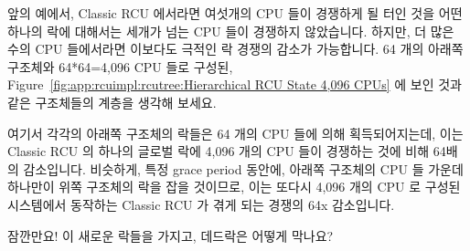 앞의 예에서, Classic RCU 에서라면 여섯개의 CPU 들이 경쟁하게 될 터인 것을 어떤
하나의 락에 대해서는 세개가 넘는 CPU 들이 경쟁하지 않았습니다.
하지만, 더 많은 수의 CPU 들에서라면 이보다도 극적인 락 경쟁의 감소가
가능합니다.
64 개의 아래쪽 구조체와 64*64=4,096 CPU 들로 구성된,
Figure~\ref{fig:app:rcuimpl:rcutree:Hierarchical RCU State 4,096 CPUs} 에 보인
것과 같은  구조체들의 계층을 생각해 보세요.

여기서 각각의 아래쪽  구조체의 락들은 64 개의 CPU 들에 의해
획득되어지는데, 이는 Classic RCU 의 하나의 글로벌 락에 4,096 개의 CPU 들이
경쟁하는 것에 비해 64배의 감소입니다.
비슷하게, 특정 grace period 동안에, 아래쪽  구조체의 CPU 들 가운데
하나만이 위쪽  구조체의 락을 잡을 것이므로, 이는 또다시 4,096 개의
CPU 로 구성된 시스템에서 동작하는 Classic RCU 가 겪게 되는 경쟁의 64x
감소입니다.
\iffalse

In the above sequence, there were never more than three CPUs
contending for any one lock, in happy contrast to Classic RCU,
where all six CPUs might contend.
However, even more dramatic reductions in lock contention are
possible with larger numbers of CPUs.
Consider a hierarchy of \co{rcu_node} structures, with
64 lower structures and 64*64=4,096 CPUs, as shown in
Figure~\ref{fig:app:rcuimpl:rcutree:Hierarchical RCU State 4,096 CPUs}.

Here each of the lower \co{rcu_node} structures' locks
are acquired by 64 CPUs, a 64-times reduction from the 4,096 CPUs
that would acquire Classic RCU's single global lock.
Similarly, during a given grace period, only one CPU from each of
the lower \co{rcu_node} structures will acquire the
upper \co{rcu_node} structure's lock, which is again
a 64x reduction from the contention level that would be experienced
by Classic RCU running on a 4,096-CPU system.
\fi

\QuickQuiz{}
	잠깐만요!
	이 새로운 락들을 가지고, 데드락은 어떻게 막나요?
	\iffalse

